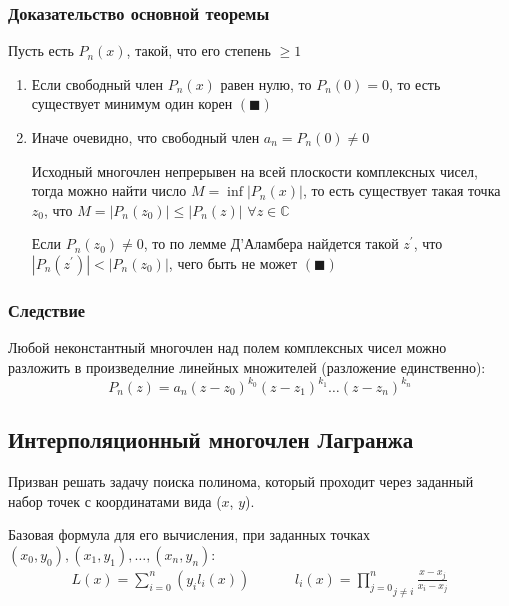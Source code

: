 \documentclass[class=article,a4paper,12pt,crop=false]{standalone}
\begin{document}
\subsubsection{Доказательство основной теоремы}

Пусть есть $P_n(x)$, такой, что его степень $\geq 1$

\begin{enumerate}
    \item {
        Если свободный член $P_n(x)$ равен нулю, то $P_n(0) = 0$, то есть
        существует минимум один корен $(\blacksquare)$
    }
    \item {
        Иначе очевидно, что свободный член $a_n = P_n(0) \neq 0$

        Исходный многочлен непрерывен на всей плоскости комплексных чисел,
        тогда можно найти число $M = \inf{|P_n(x)|}$, то есть существует
        такая точка $z_0$, что $M = |P_n(z_0)| \leq |P_n(z)|$ $\forall z \in \mathbb{C}$

        Если $P_n(z_0) \neq 0$, то по лемме Д'Аламбера найдется такой $z^{'}$,
        что $|P_n(z^{'})| < |P_n(z_0)|$, чего быть не может $(\blacksquare)$
    }
\end{enumerate}

\subsubsection{Следствие}

Любой неконстантный многочлен над полем комплексных чисел можно разложить в произведелние линейных
множителей (разложение единственно):
\begin{equation}
    P_n(z) = a_n(z - z_0)^{k_0}(z - z_1)^{k_1}\dots(z - z_n)^{k_n}
\end{equation}

\subsection{Интерполяционный многочлен Лагранжа}

Призван решать задачу поиска полинома, который проходит через заданный набор точек с
координатами вида ($x$, $y$).

Базовая формула для его вычисления, при заданных точках
$(x_0, y_0), (x_1, y_1), \dots, (x_n, y_n)$:
\begin{equation}
    \begin{aligned}
        L(x) = \sum\limits_{i = 0}^n(y_il_i(x)) & & & &
        l_i(x) = \underset{j \neq i}{\prod\limits_{j = 0}^n}\frac{x - x_j}{x_i - x_j}
    \end{aligned}
\end{equation}
\end{document}
